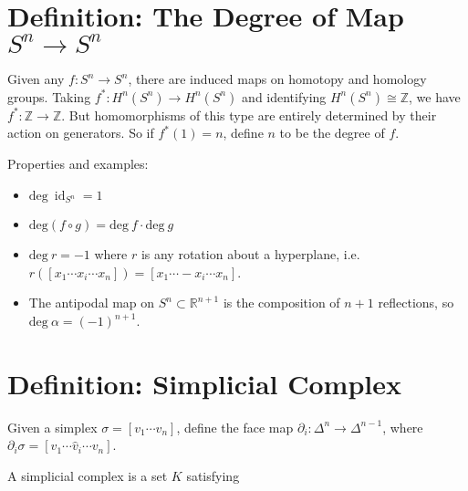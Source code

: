 \hypertarget{definition-the-degree-of-map-sn-to-sn}{%
\section{\texorpdfstring{Definition: The Degree of Map
\(S^n \to S^n\)}{Definition: The Degree of Map S\^{}n \textbackslash to S\^{}n}}\label{definition-the-degree-of-map-sn-to-sn}}

Given any \(f: S^n \to S^n\), there are induced maps on homotopy and
homology groups. Taking \(f^*: H^n(S^n) \to H^n(S^n)\) and identifying
\(H^n(S^n) \cong {\mathbb{Z}}\), we have
\(f^*: {\mathbb{Z}}\to{\mathbb{Z}}\). But homomorphisms of this type are
entirely determined by their action on generators. So if \(f^*(1) = n\),
define \(n\) to be the degree of \(f\).

Properties and examples:

\begin{itemize}
\tightlist
\item
  \(\text{deg}~\operatorname{id}_{S^n} = 1\)
\item
  \(\text{deg} (f\circ g) = \text{deg}~f \cdot \text{deg}~g\)
\item
  \(\text{deg}~r = -1\) where \(r\) is any rotation about a hyperplane,
  i.e.~\(r({\left[ {x_1 \cdots x_i \cdots x_n} \right]}) = {\left[ {x_1 \cdots -x_i \cdots x_n} \right]}\).
\item
  The antipodal map on \(S^n\subset {\mathbb{R}}^{n+1}\) is the
  composition of \(n+1\) reflections, so
  \(\text{deg}~\alpha = (-1)^{n+1}\).
\end{itemize}

\hypertarget{definition-simplicial-complex}{%
\section{Definition: Simplicial
Complex}\label{definition-simplicial-complex}}

Given a simplex \(\sigma = [v_1 \cdots v_n]\), define the face map
\({\partial}_i:\Delta^n \to\Delta^{n-1}\), where
\({\partial}_i\sigma = [v_1 \cdots \widehat{v}_i \cdots v_n]\).

A simplicial complex is a set \(K\) satisfying

